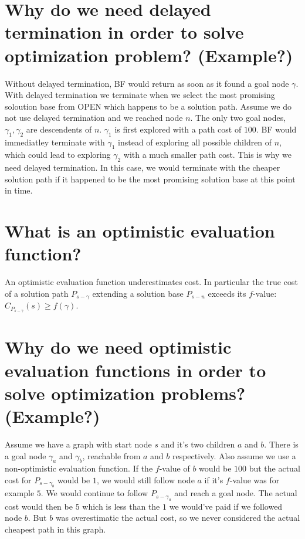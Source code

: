 \documentclass[12pt, a4paper]{article}
\begin{document}
\section{Why do we need delayed termination in order to solve optimization problem? (Example?)}
Without delayed termination, BF would return as soon as it found a goal node $\gamma$. With delayed termination we terminate when we select the most promising soloution base from OPEN which happens to be a solution path. Assume we do not use delayed termination and we reached node $n$. The only two goal nodes, $\gamma_1, \gamma_2$ are descendents of $n$. $\gamma_1$ is first explored with a path cost of $100$. BF would immediatley terminate with $\gamma_1$ instead of exploring all possible children of $n$, which could lead to exploring $\gamma_2$ with a much smaller path cost. This is why we need delayed termination. In this case, we would terminate with the cheaper solution path if it happened to be the most promising solution base at this point in time.

\section{What is an optimistic evaluation function?}
An optimistic evaluation function underestimates cost. In particular the true cost of a solution path $P_{s-\gamma}$ extending a solution base $P_{s-n}$ exceeds its $f$-value: $C_{P_{s-\gamma}}(s) \geq f(\gamma)$.

\section{Why do we need optimistic evaluation functions in order to solve optimization problems? (Example?)}
Assume we have a graph with start node $s$ and it's two children $a$ and $b$. There is a goal node $\gamma_a$ and $\gamma_b$, reachable from $a$ and $b$ respectively. Also assume we use a non-optimistic evaluation function. If the $f$-value of $b$ would be $100$ but the actual cost for $P_{s-\gamma_b}$ would be $1$, we would still follow node $a$ if it's $f$-value was for example $5$. We would continue to follow $P_{s-\gamma_a}$ and reach a goal node. The actual cost would then be $5$ which is less than the $1$ we would've paid if we followed node $b$. But $b$ was overestimatic the actual cost, so we never considered the actual cheapest path in this graph.
\end{document}
